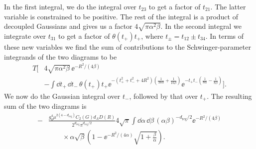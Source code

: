 In the first integral, we do the integral over $t_{23}$ to get a factor of
$t_{21}$. The latter variable is constrained to be positive. The rest of the
integral is a product of decoupled Gaussians and gives us a factor
$4\sqrt{\pi\alpha^2\beta}$. In the second integral we integrate over $t_{31}$
to get a factor of $\theta(t_+)t_+$, where $t_\pm=t_{12}\pm t_{34}$. In terms
of these new variables we find the sum of contributions to the
Schwinger-parameter integrands of the two diagrams to be
\[
\begin{aligned}
T\Big[&4\sqrt{\pi\alpha^2\beta}\,\ee^{-R^2/(4\beta)}\\[-2pt]
&-\int\dd t_+\,\dd t_-\,\theta(t_+)t_+
 \ee^{-(t_+^2+t_-^2+4R^2)\left(\frac{1}{16\alpha}+\frac{1}{16\beta}\right)}
 \ee^{-t_+t_-\left(\frac{1}{8\alpha}-\frac{1}{8\beta}\right)}\Big].
\end{aligned}
\]
We now do the Gaussian integral over $t_-$, followed by that over $t_+$. The
resulting sum of the two diagrams is
\[
\begin{aligned}
 -&\frac{g_0^4\mu^{2(4-d_{\mathrm{reg}})}C_2(G)d_AD(R)}{2^{d_{\mathrm{reg}}}\pi^{d_{\mathrm{reg}}/2}}
 4\sqrt\pi\int\dd\alpha\,\dd\beta\,(\alpha\beta)^{-d_{\mathrm{reg}}/2}
 \ee^{-R^2/(4\beta)}\\[-2pt]
&\qquad\times\alpha\sqrt\beta
 \left(1-\ee^{-R^2/(4\alpha)}\sqrt{1+\frac{\beta}{\alpha}}\right).
\end{aligned}
\]


